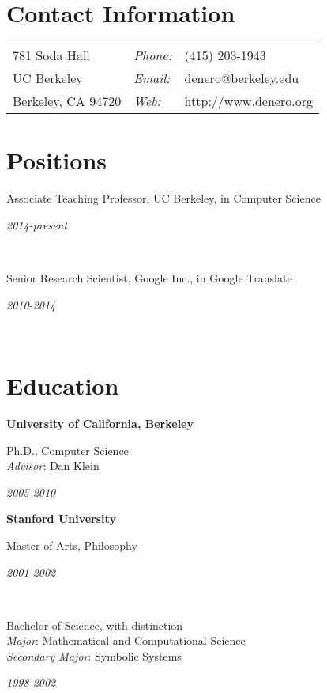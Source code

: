 \documentclass[margin,line]{res}
\newcommand{\dated}[2]{\parbox[t]{4.4in}{#1} \hspace{0.4in}
											 \parbox[t]{1in}{ {\it #2 } } }
\begin{document}

\begin{resume}

\section{\sc Contact Information}
\vspace{.05in}
\begin{tabular}{@{}p{2in}lp{4in}}
781 Soda Hall         & {\it Phone:} & (415) 203-1943        \\
UC Berkeley           & {\it Email:} & denero@berkeley.edu   \\
Berkeley, CA  94720   & {\it Web:}   & http://www.denero.org \\
\end{tabular}

\section{\sc Positions}

	\dated{Associate Teaching Professor, UC Berkeley, in Computer Science}
	{ 2014-present } \\

	\dated{Senior Research Scientist, Google Inc., in Google Translate}
	{ 2010-2014 } \\

\section{\sc Education}

	{\bf University of California, Berkeley} \\
	\dated{Ph.D., Computer Science \\
	\hspace*{1em} {\it Advisor}: Dan Klein}{ 2005-2010 }

	{\bf Stanford University} \\
	\dated{Master of Arts, Philosophy\vspace{0.12in}}{ 2001-2002 } \\
	\dated{Bachelor of Science, with distinction \\
	\hspace*{1em} {\it Major}: Mathematical and Computational Science \\
	\hspace*{1em} {\it Secondary Major}: Symbolic Systems}{ 1998-2002 }


\end{resume}
\end{document}
